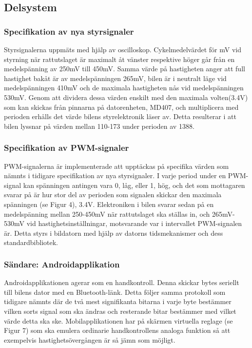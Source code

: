 \documentclass[a4paper]{article}
\begin{document}
\subsection{Delsystem}
\subsubsection{Specifikation av nya styrsignaler}
Styrsignalerna uppmäts med hjälp av oscilloskop. Cykelmedelvärdet för mV vid styrning när rattutslaget är maximalt åt vänster respektive höger går från en medelspänning av 250mV till 450mV. Samma värde på hastigheten anger att full hastighet bakåt är av medelspänningen 265mV, bilen är i neutralt läge vid medelspänningen 410mV och de maximala hastigheten nås vid medelspänningen 530mV. Genom att dividera dessa värden enskilt med den maximala volten(3.4V) som kan skickas från pinnarna på datorenheten, MD407, och multiplicera med perioden erhålls det värde bilens styrelektronik läser av. Detta resulterar i att bilen lyssnar på värden mellan 110-173 under perioden av 1388.

\subsubsection{Specifikation av PWM-signaler}
PWM-signalerna är implementerade att upptäckas på specifika värden som nämnts i tidigare specifikation av nya styrsignaler. I varje period under en PWM-signal kan spänningen antingen vara 0, låg, eller 1, hög, och det som mottagaren svarar på är hur stor del av perioden som signalen skickar den maximala spänningen (se Figur 4), 3.4V. Elektroniken i bilen svarar sedan på en medelspänning mellan 250-450mV när rattutslaget ska ställas in, och 265mV-530mV vid hastighetsinställningar, motsvarande var i intervallet PWM-signalen är. Detta styrs i bildatorn med hjälp av datorns tidsmekanismer och dess standardbibliotek.

\subsubsection{Sändare: Androidapplikation}
Androidapplikationen agerar som en handkontroll. Denna skickar bytes seriellt till bilens dator med en Bluetooth-länk. Detta följer samma protokoll som tidigare nämnts där de två mest signifikanta bitarna i varje byte bestämmer vilken sorts signal som ska ändras och resterande bitar bestämmer med vilket värde detta ska ske. Mobilapplikationen har på skärmen virtuella reglage (se Figur 7) som ska emulera ordinarie handkontrollens analoga funktion så att exempelvis hastighetsövergången är så jämn som möjligt.
\end{document}
